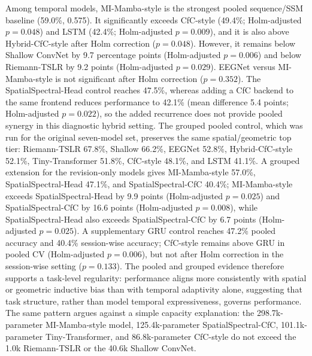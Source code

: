 \documentclass[journal]{IEEEtran}
\begin{document}
Among temporal models, MI-Mamba-style is the strongest pooled sequence/SSM baseline (59.0\%, 0.575). It significantly exceeds CfC-style (49.4\%; Holm-adjusted $p = 0.048$) and LSTM (42.4\%; Holm-adjusted $p = 0.009$), and it is also above Hybrid-CfC-style after Holm correction ($p = 0.048$). However, it remains below Shallow ConvNet by 9.7 percentage points (Holm-adjusted $p = 0.006$) and below Riemann-TSLR by 9.2 points (Holm-adjusted $p = 0.029$). EEGNet versus MI-Mamba-style is not significant after Holm correction ($p = 0.352$). The SpatialSpectral-Head control reaches 47.5\%, whereas adding a CfC backend to the same frontend reduces performance to 42.1\% (mean difference 5.4 points; Holm-adjusted $p = 0.022$), so the added recurrence does not provide pooled synergy in this diagnostic hybrid setting. The grouped pooled control, which was run for the original seven-model set, preserves the same spatial/geometric top tier: Riemann-TSLR 67.8\%, Shallow 66.2\%, EEGNet 52.8\%, Hybrid-CfC-style 52.1\%, Tiny-Transformer 51.8\%, CfC-style 48.1\%, and LSTM 41.1\%. A grouped extension for the revision-only models gives MI-Mamba-style 57.0\%, SpatialSpectral-Head 47.1\%, and SpatialSpectral-CfC 40.4\%; MI-Mamba-style exceeds SpatialSpectral-Head by 9.9 points (Holm-adjusted $p=0.025$) and SpatialSpectral-CfC by 16.6 points (Holm-adjusted $p=0.008$), while SpatialSpectral-Head also exceeds SpatialSpectral-CfC by 6.7 points (Holm-adjusted $p=0.025$). A supplementary GRU control reaches 47.2\% pooled accuracy and 40.4\% session-wise accuracy; CfC-style remains above GRU in pooled CV (Holm-adjusted $p = 0.006$), but not after Holm correction in the session-wise setting ($p = 0.133$). The pooled and grouped evidence therefore supports a task-level regularity: performance aligns more consistently with spatial or geometric inductive bias than with temporal adaptivity alone, suggesting that task structure, rather than model temporal expressiveness, governs performance. The same pattern argues against a simple capacity explanation: the 298.7k-parameter MI-Mamba-style model, 125.4k-parameter SpatialSpectral-CfC, 101.1k-parameter Tiny-Transformer, and 86.8k-parameter CfC-style do not exceed the 1.0k Riemann-TSLR or the 40.6k Shallow ConvNet.
\end{document}
